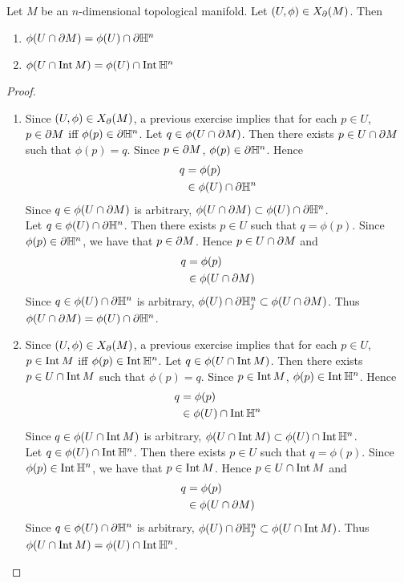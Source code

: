 \documentclass{book}
\begin{document}
	\begin{ex} 
		Let $M$ be an $n$-dimensional topological manifold. Let $(U, \phi) \in X_{\partial}(M)$. Then 
		\begin{enumerate}
			\item $\phi(U \cap \partial M) = \phi(U) \cap \partial \mathbb{H}^n$ 
			\item $\phi(U \cap \operatorname{Int} M) = \phi(U) \cap \operatorname{Int} \mathbb{H}^n$ 
		\end{enumerate}
	\end{ex}

	\begin{proof} \
		\begin{enumerate}
			\item Since $(U, \phi) \in X_{\partial}(M)$, a previous exercise implies that for each $p \in U$, $p \in \partial M$ iff $\phi(p) \in \partial \mathbb{H}^n$. Let $q \in \phi(U \cap \partial M)$. Then there exists $p \in U \cap \partial M$ such that $\phi(p) = q$. Since $p \in \partial M$, $\phi(p) \in \partial \mathbb{H}^n$. Hence 
			\begin{align*}
				q 
				& = \phi(p) \\
				& \in \phi(U) \cap \partial \mathbb{H}^n
			\end{align*}
			Since $q \in \phi(U \cap \partial M)$ is arbitrary, $\phi(U \cap \partial M) \subset \phi(U) \cap \partial \mathbb{H}^n$. \\
			Let $q \in \phi(U) \cap \partial \mathbb{H}^n$. Then there exists $p \in U$ such that $q = \phi(p)$. Since $\phi(p) \in \partial \mathbb{H}^n$, we have that $p \in \partial M$. Hence $p \in U \cap \partial M$ and 
			\begin{align*}
				q 
				& = \phi(p) \\
				& \in \phi(U \cap \partial M)
			\end{align*}
			Since $q \in \phi(U) \cap \partial \mathbb{H}^n$ is arbitrary, $\phi(U) \cap \partial \mathbb{H}^n_j \subset \phi(U \cap \partial M)$. Thus $\phi(U \cap \partial M) = \phi(U) \cap \partial \mathbb{H}^n$.
			\item Since $(U, \phi) \in X_{\partial}(M)$, a previous exercise implies that for each $p \in U$, $p \in \operatorname{Int} M$ iff $\phi(p) \in \operatorname{Int} \mathbb{H}^n$.  Let $q \in \phi(U \cap \operatorname{Int} M)$. Then there exists $p \in U \cap \operatorname{Int} M$ such that $\phi(p) = q$. Since $p \in \operatorname{Int} M$, $\phi(p) \in \operatorname{Int} \mathbb{H}^n$. Hence 
			\begin{align*}
				q 
				& = \phi(p) \\
				& \in \phi(U) \cap \operatorname{Int} \mathbb{H}^n
			\end{align*}
			Since $q \in \phi(U \cap \operatorname{Int} M)$ is arbitrary, $\phi(U \cap \operatorname{Int} M) \subset \phi(U) \cap \operatorname{Int} \mathbb{H}^n$. \\
			Let $q \in \phi(U) \cap \operatorname{Int} \mathbb{H}^n$. Then there exists $p \in U$ such that $q = \phi(p)$. Since $\phi(p) \in \operatorname{Int} \mathbb{H}^n$, we have that $p \in \operatorname{Int} M$. Hence $p \in U \cap \operatorname{Int} M$ and 
			\begin{align*}
				q 
				& = \phi(p) \\
				& \in \phi(U \cap \partial M)
			\end{align*}
			Since $q \in \phi(U) \cap \partial \mathbb{H}^n$ is arbitrary, $\phi(U) \cap \partial \mathbb{H}^n_j \subset \phi(U \cap \operatorname{Int} M)$. Thus $\phi(U \cap \operatorname{Int} M) = \phi(U) \cap \operatorname{Int} \mathbb{H}^n$.
		\end{enumerate}
	\end{proof}
\end{document}
